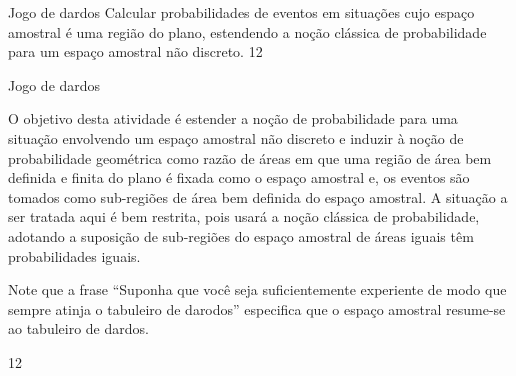 \begin{objectives}{Jogo de dardos}
{
Calcular probabilidades de eventos em situações cujo espaço amostral é uma região do plano, estendendo a noção clássica de probabilidade para um espaço amostral não discreto.
}{1}{2}
\end{objectives}
\begin{sugestions}{Jogo de dardos}
{
O objetivo desta atividade é estender a noção de probabilidade para uma situação envolvendo um espaço amostral não discreto e induzir à noção de probabilidade geométrica como razão de áreas em que uma região de área bem definida e finita do plano é fixada como o espaço amostral e, os eventos são tomados como sub-regiões de área bem definida do espaço amostral. A situação a ser tratada aqui é bem restrita, pois usará a noção clássica de probabilidade, adotando a suposição de sub-regiões do espaço amostral de áreas iguais têm probabilidades iguais.

Note que a frase “Suponha que você seja suficientemente experiente de modo que sempre atinja o tabuleiro de darodos”{} especifica que o espaço amostral resume-se ao tabuleiro de dardos.
}{1}{2}
\end{sugestions}
\clearmargin
\marginpar{\vspace{.5em}}
